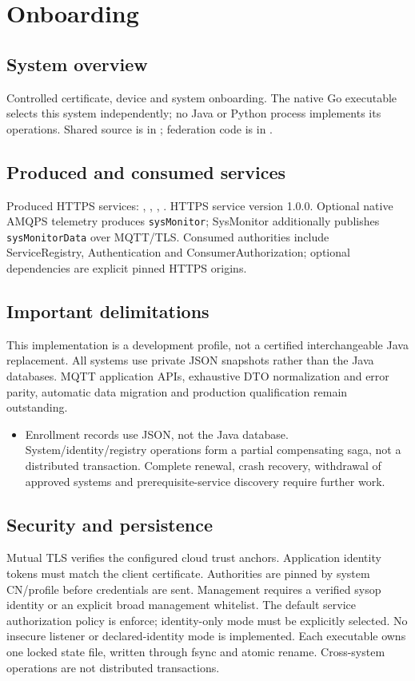 \documentclass[a4paper]{arrowhead}
\begin{document}
\ArrowheadSetup
\section{Onboarding}
\subsection{System overview}
Controlled certificate, device and system onboarding. The native Go executable selects this system independently; no Java or Python process implements its operations. Shared source is in ; federation code is in .
\subsection{Produced and consumed services}
Produced HTTPS services: , \allowbreak {}, \allowbreak {}, \allowbreak {}.
HTTPS service version 1.0.0. Optional native AMQPS telemetry produces \texttt{sysMonitor}; SysMonitor additionally publishes \texttt{sysMonitorData} over MQTT/TLS. Consumed authorities include ServiceRegistry, Authentication and ConsumerAuthorization; optional dependencies are explicit pinned HTTPS origins.
\subsection{Important delimitations}
This implementation is a development profile, not a certified interchangeable Java replacement. All systems use private JSON snapshots rather than the Java databases. MQTT application APIs, exhaustive DTO normalization and error parity, automatic data migration and production qualification remain outstanding.
\begin{itemize}
\item Enrollment records use JSON, not the Java database. System/identity/registry operations form a partial compensating saga, not a distributed transaction. Complete renewal, crash recovery, withdrawal of approved systems and prerequisite-service discovery require further work.
\end{itemize}
\subsection{Security and persistence}
Mutual TLS verifies the configured cloud trust anchors. Application identity tokens must match the client certificate. Authorities are pinned by system CN/profile before credentials are sent. Management requires a verified sysop identity or an explicit broad management whitelist. The default service authorization policy is enforce; identity-only mode must be explicitly selected. No insecure listener or declared-identity mode is implemented. Each executable owns one locked state file, written through fsync and atomic rename. Cross-system operations are not distributed transactions.
\end{document}
